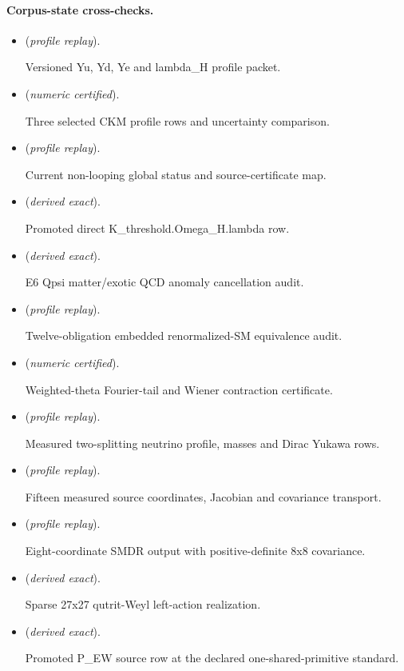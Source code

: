 \documentclass[11pt]{article}
\begin{document}
\paragraph{Corpus-state cross-checks.}
\begin{itemize}
\setlength{\itemsep}{0.25em}
\item {} (\emph{profile replay}).\par Versioned Yu, Yd, Ye and lambda\_H profile packet.
\item {} (\emph{numeric certified}).\par Three selected CKM profile rows and uncertainty comparison.
\item {} (\emph{profile replay}).\par Current non-looping global status and source-certificate map.
\item {} (\emph{derived exact}).\par Promoted direct K\_threshold.Omega\_H.lambda row.
\item {} (\emph{derived exact}).\par E6 Qpsi matter/exotic QCD anomaly cancellation audit.
\item {} (\emph{profile replay}).\par Twelve-obligation embedded renormalized-SM equivalence audit.
\item {} (\emph{numeric certified}).\par Weighted-theta Fourier-tail and Wiener contraction certificate.
\item {} (\emph{profile replay}).\par Measured two-splitting neutrino profile, masses and Dirac Yukawa rows.
\item {} (\emph{profile replay}).\par Fifteen measured source coordinates, Jacobian and covariance transport.
\item {} (\emph{profile replay}).\par Eight-coordinate SMDR output with positive-definite 8x8 covariance.
\item {} (\emph{derived exact}).\par Sparse 27x27 qutrit-Weyl left-action realization.
\item {} (\emph{derived exact}).\par Promoted P\_EW source row at the declared one-shared-primitive standard.
\end{itemize}
\end{document}
